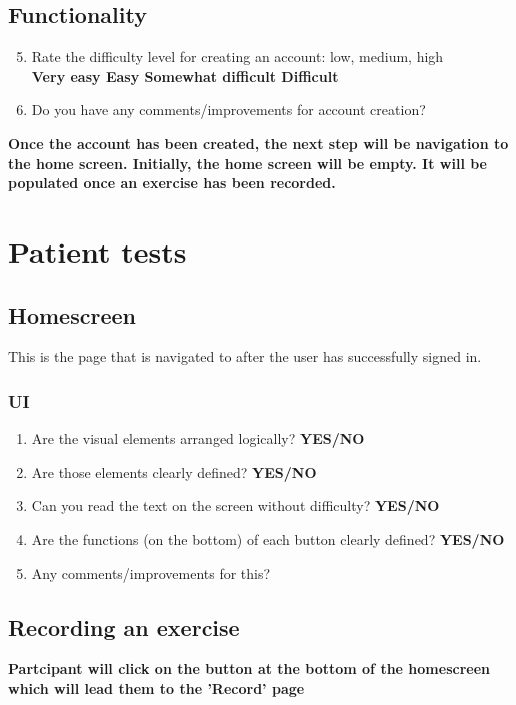 \documentclass{article}
\begin{document}
\subsection{Functionality}
\begin{enumerate}
    \setcounter{enumi}{4}
    \item Rate the difficulty level for creating an account: low, medium, high
    \\\textbf{Very easy \qquad Easy \qquad Somewhat difficult \qquad Difficult}
    \item Do you have any comments/improvements for account creation?
\end{enumerate}
\textbf{Once the account has been created, the next step will be navigation to the home screen. 
Initially, the home screen will be empty. It will be populated once an exercise has been recorded.}

\section{Patient tests}

\subsection{Homescreen}
This is the page that is navigated to after the user has successfully signed in. 
\subsubsection{UI}
\begin{enumerate}
    \item Are the visual elements arranged logically? \textbf{YES/NO}
    \item Are those elements clearly defined? \textbf{YES/NO}
    \item Can you read the text on the screen without difficulty? \textbf{YES/NO}
    \item Are the functions (on the bottom) of each button clearly defined? \textbf{YES/NO}
    \item Any comments/improvements for this?
\end{enumerate}

\subsection{Recording an exercise}
\textbf{Partcipant will click on the button at the bottom of the homescreen which will lead them to the 'Record' page}
\end{document}
